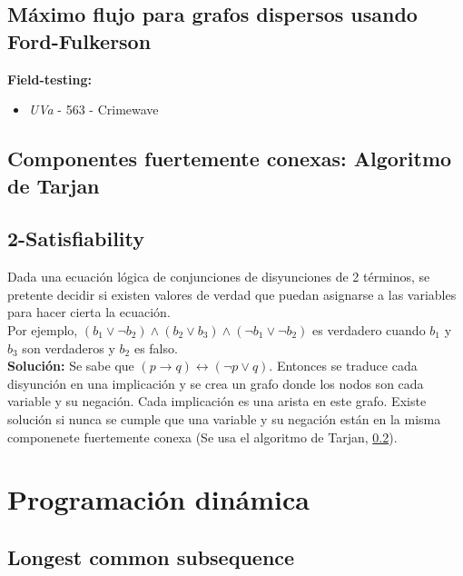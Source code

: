 \documentclass[10pt,letterpaper,twocolumn]{article}
\newcommand{\codigofuente}[1]{

\dotfill
}
\begin{document}
\codigofuente{./src/grafos/ford_fulkerson.cpp}

\subsection{Máximo flujo para grafos dispersos usando Ford-Fulkerson}

\small
\textbf{Field-testing:}
\begin{itemize}
\item \emph{UVa} - 563 - Crimewave
\end{itemize}
\normalsize

\codigofuente{./src/grafos/ford_fulkerson_sparse.cpp}

\subsection{Componentes fuertemente conexas: Algoritmo de Tarjan}
\label{tarjan}
\codigofuente{./src/grafos/tarjan.cpp}

\subsection{2-Satisfiability}
Dada una ecuación lógica de conjunciones de disyunciones de 2 términos, se pretente decidir si existen valores de verdad que puedan asignarse a las variables para hacer cierta la ecuación. \\
Por ejemplo, $(b_1 \vee \neg b_2) \wedge (b_2 \vee b_3) \wedge (\neg b_1 \vee \neg b_2) $ es verdadero cuando $b_1$ y $b_3$ son verdaderos y $b_2$ es falso. \\
\textbf{Solución:} Se sabe que $(p \rightarrow q) \leftrightarrow (\neg p \vee q)$. Entonces se traduce cada disyunción en una implicación y se crea un grafo donde los nodos son cada variable y su negación. Cada implicación es una arista en este grafo. Existe solución si nunca se cumple que una variable y su negación están en la misma componenete fuertemente conexa (Se usa el algoritmo de Tarjan, \ref{tarjan}).

\section{Programación dinámica}
\subsection{Longest common subsequence}
\codigofuente{./src/dp/lcs.cpp}
\end{document}
